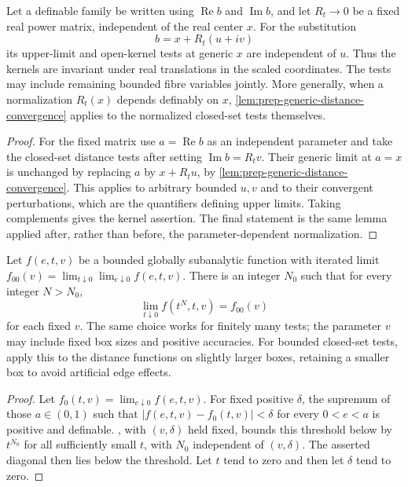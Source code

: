 \begin{corollary}\label{cor:prep-generic-freezing}
Let a definable family be written using $\operatorname{Re}b$ and $\operatorname{Im}b$, and let $R_t\to0$ be a fixed real power matrix, independent of the real center $x$. For the substitution
\[
 b=x+R_t(u+iv)
\]
its upper-limit and open-kernel tests at generic $x$ are independent of $u$. Thus the kernels are invariant under real translations in the scaled coordinates. The tests may include remaining bounded fibre variables jointly. More generally, when a normalization $R_t(x)$ depends definably on $x$, \cref{lem:prep-generic-distance-convergence} applies to the normalized closed-set tests themselves.
\end{corollary}

\begin{proof}
For the fixed matrix use $a=\operatorname{Re}b$ as an independent parameter and take the closed-set distance tests after setting $\operatorname{Im}b=R_tv$. Their generic limit at $a=x$ is unchanged by replacing $a$ by $x+R_tu$, by \cref{lem:prep-generic-distance-convergence}. This applies to arbitrary bounded $u,v$ and to their convergent perturbations, which are the quantifiers defining upper limits. Taking complements gives the kernel assertion. The final statement is the same lemma applied after, rather than before, the parameter-dependent normalization.
\end{proof}

\begin{lemma}\label{lem:prep-power-diagonalization}
Let $f(e,t,v)$ be a bounded globally subanalytic function with iterated limit $f_{00}(v)=\lim_{t\downarrow0}\lim_{e\downarrow0} f(e,t,v)$. There is an integer $N_0$ such that for every integer $N>N_0$,
\[
 \lim_{t\downarrow0}f(t^N,t,v)=f_{00}(v)
\]
for each fixed $v$. The same choice works for finitely many tests; the parameter $v$ may include fixed box sizes and positive accuracies. For bounded closed-set tests, apply this to the distance functions on slightly larger boxes, retaining a smaller box to avoid artificial edge effects.
\end{lemma}

\begin{proof}
Let $f_0(t,v)=\lim_{e\downarrow0}f(e,t,v)$. For fixed positive $\delta$, the supremum of those $a\in(0,1)$ such that $|f(e,t,v)-f_0(t,v)|<\delta$ for every $0<e<a$ is positive and definable. , with $(v,\delta)$ held fixed, bounds this threshold below by $t^{N_0}$ for all sufficiently small $t$, with $N_0$ independent of $(v,\delta)$. The asserted diagonal then lies below the threshold. Let $t$ tend to zero and then let $\delta$ tend to zero.
\end{proof}

